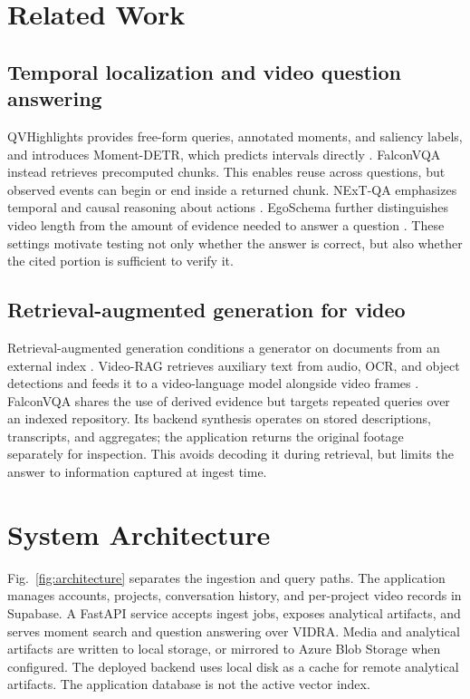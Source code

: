 \documentclass{ieeeaccess}
\begin{document}
\section{Related Work}
\label{sec:related}
\subsection{Temporal localization and video question answering}
QVHighlights provides free-form queries, annotated moments, and saliency labels, and introduces Moment-DETR, which predicts intervals directly \cite{qvhighlights}. FalconVQA instead retrieves precomputed chunks. This enables reuse across questions, but observed events can begin or end inside a returned chunk. NExT-QA emphasizes temporal and causal reasoning about actions \cite{nextqa}. EgoSchema further distinguishes video length from the amount of evidence needed to answer a question \cite{egoschema}. These settings motivate testing not only whether the answer is correct, but also whether the cited portion is sufficient to verify it.

\subsection{Retrieval-augmented generation for video}
Retrieval-augmented generation conditions a generator on documents from an external index \cite{lewis}. Video-RAG retrieves auxiliary text from audio, OCR, and object detections and feeds it to a video-language model alongside video frames \cite{videorag}. FalconVQA shares the use of derived evidence but targets repeated queries over an indexed repository. Its backend synthesis operates on stored descriptions, transcripts, and aggregates; the application returns the original footage separately for inspection. This avoids decoding it during retrieval, but limits the answer to information captured at ingest time.

\section{System Architecture}
\label{sec:architecture}


Fig.~\ref{fig:architecture} separates the ingestion and query paths. The application manages accounts, projects, conversation history, and per-project video records in Supabase. A FastAPI service accepts ingest jobs, exposes analytical artifacts, and serves moment search and question answering over VIDRA. Media and analytical artifacts are written to local storage, or mirrored to Azure Blob Storage when configured. The deployed backend uses local disk as a cache for remote analytical artifacts. The application database is not the active vector index.
\end{document}
